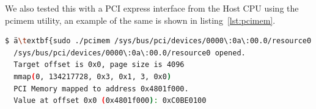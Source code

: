 \normalsize
\doublespacing

We also tested this with a PCI express interface from the Host CPU using the pcimem utility, an example of the same is shown in
listing~\ref{lst:pcimem}.

\singlespacing
\scriptsize{
\begin{lstlisting}[language=bash, caption=pcimem in action, label={lst:pcimem}, emph={resource0}]
$ ä\textbf{sudo ./pcimem /sys/bus/pci/devices/0000\:0a\:00.0/resource0 0 w}ä
  /sys/bus/pci/devices/0000\:0a\:00.0/resource0 opened.
  Target offset is 0x0, page size is 4096
  mmap(0, 134217728, 0x3, 0x1, 3, 0x0)
  PCI Memory mapped to address 0x4801f000.
  Value at offset 0x0 (0x4801f000): 0xC0BE0100
\end{lstlisting}
}
\normalsize
\doublespacing
